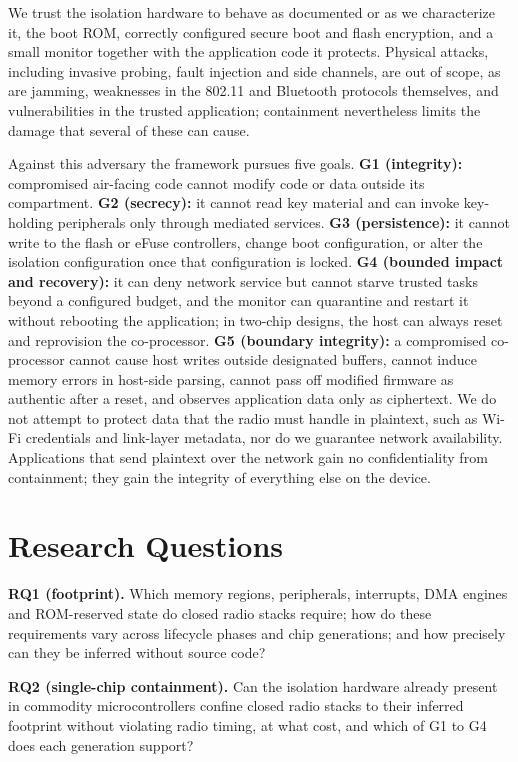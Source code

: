 \documentclass[conference,10pt]{IEEEtran}
\begin{document}
We trust the isolation hardware to behave as documented or as we characterize it, the boot ROM, correctly configured secure boot and flash encryption, and a small monitor together with the application code it protects. Physical attacks, including invasive probing, fault injection and side channels, are out of scope, as are jamming, weaknesses in the 802.11 and Bluetooth protocols themselves, and vulnerabilities in the trusted application; containment nevertheless limits the damage that several of these can cause.

Against this adversary the framework pursues five goals. \textbf{G1 (integrity):} compromised air-facing code cannot modify code or data outside its compartment. \textbf{G2 (secrecy):} it cannot read key material and can invoke key-holding peripherals only through mediated services. \textbf{G3 (persistence):} it cannot write to the flash or eFuse controllers, change boot configuration, or alter the isolation configuration once that configuration is locked. \textbf{G4 (bounded impact and recovery):} it can deny network service but cannot starve trusted tasks beyond a configured budget, and the monitor can quarantine and restart it without rebooting the application; in two-chip designs, the host can always reset and reprovision the co-processor. \textbf{G5 (boundary integrity):} a compromised co-processor cannot cause host writes outside designated buffers, cannot induce memory errors in host-side parsing, cannot pass off modified firmware as authentic after a reset, and observes application data only as ciphertext. We do not attempt to protect data that the radio must handle in plaintext, such as Wi-Fi credentials and link-layer metadata, nor do we guarantee network availability. Applications that send plaintext over the network gain no confidentiality from containment; they gain the integrity of everything else on the device.

\section{Research Questions}
\label{sec:rq}

\textbf{RQ1 (footprint).} Which memory regions, peripherals, interrupts, DMA engines and ROM-reserved state do closed radio stacks require; how do these requirements vary across lifecycle phases and chip generations; and how precisely can they be inferred without source code?

\textbf{RQ2 (single-chip containment).} Can the isolation hardware already present in commodity microcontrollers confine closed radio stacks to their inferred footprint without violating radio timing, at what cost, and which of G1 to G4 does each generation support?
\end{document}
